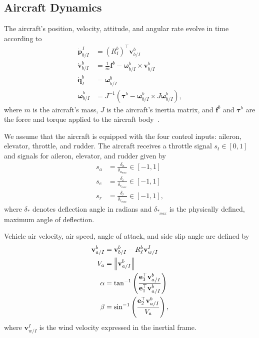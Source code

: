 \documentclass[letterpaper, 10 pt, conference]{ieeeconf}  %
\begin{document}
	
	\begin{appendices}
		
		\section{Aircraft Dynamics}
		\label{sec:dynamics}
		
		The aircraft's position, velocity, attitude, and angular rate evolve in time according to
		\begin{align}
		\dot{\mathbf{p}}_{b/I}^{I} & =\left(R_{I}^{b}\right)^{\top}\mathbf{v}_{b/I}^{b}\label{eq:lqr_pdot_true}\\
		\dot{\mathbf{v}}_{b/I}^{b} & =\frac{1}{m}\mathbf{f}^{b}-\boldsymbol{\omega}_{b/I}^{b}\times\mathbf{v}_{b/I}^{b}\label{eq:lqr_vdot_true}\\
		\dot{\mathbf{q}}_{I}^{b} & =\boldsymbol{\omega}_{b/I}^{b}\label{eq:lqr_qdot_true}\\
		\dot{\boldsymbol{\omega}}_{b/I}^{b} & =J^{-1}\left(\boldsymbol{\tau}^{b}-\boldsymbol{\omega}_{b/I}^{b}\times J\boldsymbol{\omega}_{b/I}^{b}\right),\label{eq:lqr_omegadot_true}
		\end{align}
		where $m$ is the aircraft's mass, $J$ is the aircraft's inertia matrix, and $\mathbf{f}^b$ and $\boldsymbol{\tau}^b$ are the force and torque applied to the aircraft body~\cite{beard2012small}.
		
		We assume that the aircraft is equipped with the four control inputs: aileron, elevator, throttle, and rudder.
		The aircraft receives a throttle signal $s_t\in\left[0,1\right]$ and signals for aileron, elevator, and rudder given by
		\begin{align}
		s_{a} &= \frac{\delta_{a}}{\delta_{a_{max}}}\in\left[-1,1\right] \\
		s_{e} &= \frac{\delta_{e}}{\delta_{e_{max}}}\in\left[-1,1\right] \\
		s_{r} &= \frac{\delta_{r}}{\delta_{r_{max}}}\in\left[-1,1\right],
		\end{align}
		where $\delta_*$ denotes deflection angle in radians and $\delta_{*_{max}}$ is the physically defined, maximum angle of deflection.
		
		Vehicle air velocity, air speed, angle of attack, and side slip angle are defined by
		\begin{align}
		\mathbf{v}_{a/I}^{b} & =\mathbf{v}_{b/I}^{b}-R_{I}^{b}\mathbf{v}_{w/I}^{I}\\
		V_{a} & =\left\lVert\mathbf{v}_{a/I}^{b}\right\rVert \\
		\alpha & =\tan^{-1}\left(\frac{\mathbf{e}_{3}^{\top}\mathbf{v}_{a/I}^{b}}{\mathbf{e}_{1}^{\top}\mathbf{v}_{a/I}^{b}}\right)\\
		\beta & =\sin^{-1}\left(\frac{\mathbf{e}_{2}^{\top}\mathbf{v}_{a/I}^{b}}{V_{a}}\right),
		\end{align}
		where $\mathbf{v}_{w/I}^I$ is the wind velocity expressed in the inertial frame.
		

\end{appendices}
\end{document}

